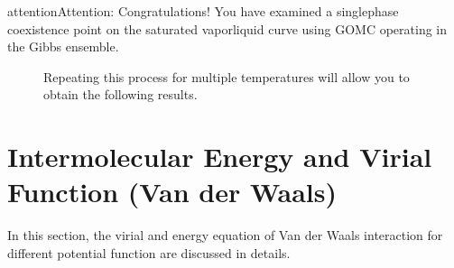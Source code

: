 \documentclass[letterpaper,10pt,english]{sphinxmanual}
\begin{document}
\begin{sphinxadmonition}{attention}{Attention:}
\sphinxAtStartPar
Congratulations! You have examined a single\sphinxhyphen{}phase coexistence point on the saturated vapor\sphinxhyphen{}liquid curve using GOMC operating in the Gibbs ensemble.
\end{sphinxadmonition}

\begin{figure}[htbp]
\centering
\capstart

\noindent{}
\caption{Repeating this process for multiple temperatures will allow you to obtain the following results.}\label{\detokenize{putting_all_together:id1}}\end{figure}


\chapter{Intermolecular Energy and Virial Function (Van der Waals)}
\label{\detokenize{vdw_energy:intermolecular-energy-and-virial-function-van-der-waals}}\label{\detokenize{vdw_energy::doc}}
\sphinxAtStartPar
In this section, the virial and energy equation of Van der Waals interaction for different potential function are discussed in details.
\end{document}
